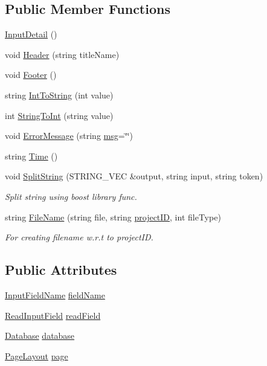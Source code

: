 \subsection*{\-Public \-Member \-Functions}
\begin{DoxyCompactItemize}
\item 
\hyperlink{classInputDetail_ab53655b14d922eb32b5d5d06c702e497}{\-Input\-Detail} ()
\item 
void \hyperlink{classInputDetail_ae55dcc0e15b85d302a09046b145330bb}{\-Header} (string title\-Name)
\item 
void \hyperlink{classInputDetail_acbc05b1bc6a371cf0a52222cc95e467d}{\-Footer} ()
\item 
string \hyperlink{classInputDetail_ad0a78d7c864bcccf7813a526d59573be}{\-Int\-To\-String} (int value)
\item 
int \hyperlink{classInputDetail_aaf532dd61f0aee82b116fef2da8e821f}{\-String\-To\-Int} (string value)
\item 
void \hyperlink{classInputDetail_a7f1d6cf5e946dadd511c2437b796e5f7}{\-Error\-Message} (string \hyperlink{classInputDetail_a1abb16cd695678c3fa05e3c812823fee}{msg}=\char`\"{}\char`\"{})
\item 
string \hyperlink{classInputDetail_aaf6caee10a13697ca6dc2bc9aa02e8ab}{\-Time} ()
\item 
void \hyperlink{classInputDetail_aba635a55313b14cf8bb285560a55498e}{\-Split\-String} (\-S\-T\-R\-I\-N\-G\-\_\-\-V\-E\-C \&output, string input, string token)
\begin{DoxyCompactList}\small\item\em \-Split string using boost library func. \end{DoxyCompactList}\item 
string \hyperlink{classInputDetail_a509ee6dd2de52e87cb764d0b0cceb05a}{\-File\-Name} (string file, string \hyperlink{classInputDetail_a08069ee622c626c038b821ddcc7427b4}{project\-I\-D}, int file\-Type)
\begin{DoxyCompactList}\small\item\em \-For creating filename w.\-r.\-t to project\-I\-D. \end{DoxyCompactList}\end{DoxyCompactItemize}
\subsection*{\-Public \-Attributes}
\begin{DoxyCompactItemize}
\item 
\hyperlink{classInputFieldName}{\-Input\-Field\-Name} \hyperlink{classInputDetail_ac6f85380c5152c406d483726382c4798}{field\-Name}
\item 
\hyperlink{classReadInputField}{\-Read\-Input\-Field} \hyperlink{classInputDetail_ac0cc70b017ef94fb55acb46fc44f0df5}{read\-Field}
\item 
\hyperlink{classDatabase}{\-Database} \hyperlink{classInputDetail_a479cd6c13833bd5de6e5630078c961b6}{database}
\item 
\hyperlink{classPageLayout}{\-Page\-Layout} \hyperlink{classInputDetail_ae487757aaafba4ac372c327e2b7a9673}{page}
\end{DoxyCompactItemize}
